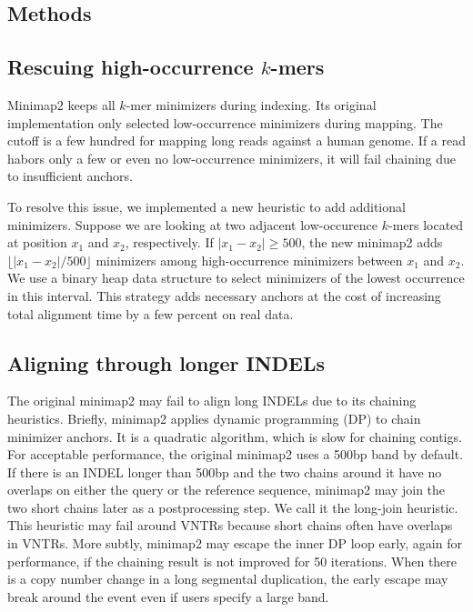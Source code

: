 \documentclass{bioinfo}
\begin{document}
\begin{methods}
\section{Methods}

\subsection{Rescuing high-occurrence $k$-mers}
Minimap2 keeps all $k$-mer minimizers during indexing. Its original
implementation only selected low-occurrence minimizers during mapping. The
cutoff is a few hundred for mapping long reads against a human genome. If a
read habors only a few or even no low-occurrence minimizers, it will fail
chaining due to insufficient anchors.

To resolve this issue, we implemented a new heuristic to add additional
minimizers. Suppose we are looking at two adjacent low-occurence $k$-mers
located at position $x_1$ and $x_2$, respectively. If $|x_1-x_2|\ge500$, the
new minimap2 adds $\lfloor|x_1-x_2|/500\rfloor$ minimizers among
high-occurrence minimizers between $x_1$ and $x_2$. We use a binary heap data
structure to select minimizers of the lowest occurrence in this interval.
This strategy adds necessary anchors at the cost of increasing total alignment
time by a few percent on real data.

\subsection{Aligning through longer INDELs}
The original minimap2 may fail to align long INDELs due to its chaining
heuristics. Briefly, minimap2 applies dynamic programming (DP) to chain
minimizer anchors. It is a quadratic algorithm, which is slow for chaining
contigs. For acceptable performance, the original minimap2 uses a 500bp band by
default. If there is an INDEL longer than 500bp and the two chains around it
have no overlaps on either the query or the reference sequence, minimap2 may
join the two short chains later as a postprocessing step. We call it the
long-join heuristic. This heuristic may fail around VNTRs because short chains
often have overlaps in VNTRs. More subtly, minimap2 may escape the inner DP
loop early, again for performance, if the chaining result is not improved for
50 iterations. When there is a copy number change in a long segmental
duplication, the early escape may break around the event even if users
specify a large band.


\end{methods}
\end{document}
